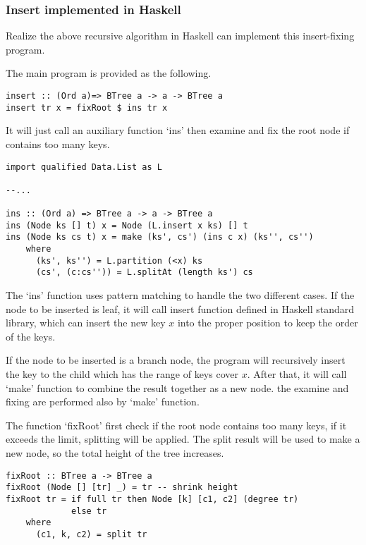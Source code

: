 \documentclass{article}
\begin{document}
\subsubsection*{Insert implemented in Haskell}
Realize the above recursive algorithm in Haskell can implement this
insert-fixing program.

The main program is provided as the following.

\lstset{language=Haskell}
\begin{lstlisting}
insert :: (Ord a)=> BTree a -> a -> BTree a
insert tr x = fixRoot $ ins tr x
\end{lstlisting} %

It will just call an auxiliary function `ins' then examine and
fix the root node if contains too many keys.

\begin{lstlisting}
import qualified Data.List as L

--...

ins :: (Ord a) => BTree a -> a -> BTree a
ins (Node ks [] t) x = Node (L.insert x ks) [] t
ins (Node ks cs t) x = make (ks', cs') (ins c x) (ks'', cs'')
    where
      (ks', ks'') = L.partition (<x) ks
      (cs', (c:cs'')) = L.splitAt (length ks') cs
\end{lstlisting}

The `ins' function uses pattern matching to handle the two different
cases. If the node to be inserted is leaf, it will call insert
function defined in Haskell standard library, which can insert the
new key $x$ into the proper position to keep the order of the keys.

If the node to be inserted is a branch node, the program will recursively
insert the key to the child which has the range of keys cover $x$.
After that, it will call `make' function to combine the result
together as a new node. the examine and fixing are performed also
by `make' function.

The function `fixRoot' first check if the root node contains too
many keys, if it exceeds the limit, splitting will be applied.
The split result will be used to make a new node, so the total
height of the tree increases.

\begin{lstlisting}
fixRoot :: BTree a -> BTree a
fixRoot (Node [] [tr] _) = tr -- shrink height
fixRoot tr = if full tr then Node [k] [c1, c2] (degree tr)
             else tr
    where
      (c1, k, c2) = split tr
\end{lstlisting}
\end{document}
